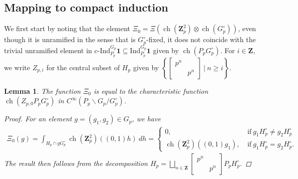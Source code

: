 \documentclass{amsart}%
\theoremstyle{plain}
\newtheorem{lem}[thm]{Lemma}
\theoremstyle{plain}
\theoremstyle{remark}
\DeclareMathOperator{\ch}{ch}
\begin{document}
\subsection{Mapping to compact induction}
We first start by noting that the element $\Xi_0=\Xi(\ch(\mathbf{Z}_p^2)\otimes \ch(G_p^\circ))$, even though it is unramified in the sense that is $G_p^\circ$-fixed, it does not coincide with the trivial unramified element in $\mathrm{c}\text{-}\mathrm{Ind}_{P_p}^{G_p}\mathbf{1}\subseteq\mathrm{Ind}_{P_p}^{G_p}\mathbf{1}$ given by $\ch(P_pG_p^\circ)$. For $i\in\mathbf{Z}$, we write $Z_{p,i}$ for the central subset of $H_p$ given by
$\left\{\left[\begin{smallmatrix}
    p^n & \\
    & p^n
\end{smallmatrix}\right]\ |\ n\geq i\right\}.$
\begin{lem}\label{lem Xi_0}
    The function $\Xi_0$ is equal to the characteristic function $\ch(Z_{p,0} P_pG_p^\circ)$ in $C^\infty(P_p\backslash G_p/G_p^\circ)$.
    \begin{proof}
        For an element $g=(g_1,g_2)\in G_p$, we have
        \begin{align*}
            \Xi_0(g)=\int_{H_p\cap g G_p^\circ} \ch(\mathbf{Z}_p^2)((0,1)h)\ dh
            =\begin{cases}
                0,\ &\mathrm{if}\ g_1H_p^\circ\neq g_2 H_p^\circ\\
                \ch(\mathbf{Z}_p^2)((0,1)g_1),\ &\mathrm{if}\ g_1H_p^\circ= g_2H_p^\circ.
            \end{cases}
        \end{align*}
        The result then follows from the decomposition $H_p=\bigsqcup_{n\in\mathbf{Z}}\left[\begin{smallmatrix}
            p^n & \\
            & p^n
        \end{smallmatrix}\right] P_pH_p^\circ.$
    \end{proof}
\end{lem}
\end{document}
